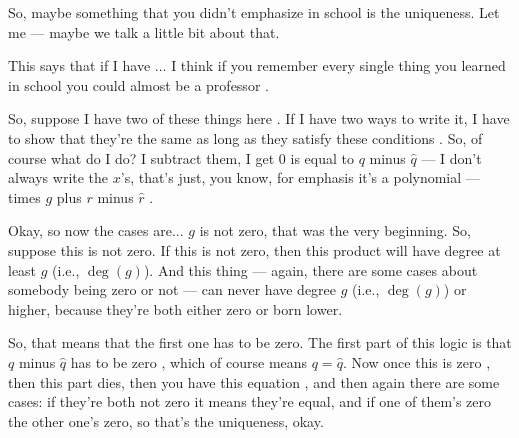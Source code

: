 \begin{content}
\end{content}

\begin{proofWrapper}

\begin{speech}[00:28:56 - 00:30:46]
So, maybe something that you didn't emphasize in school is the uniqueness. Let me --- maybe we talk a little bit about that.

This says that if I have ... I think if you remember every single thing you learned in school you could almost be a professor .

So, suppose I have two of these things here . If I have two ways to write it, I have to show that they're the same as long as they satisfy these conditions . So, of course what do I do? I subtract them, I get $0$ is equal to $q$ minus $\hat{q}$ --- I don't always write the $x$'s, that's just, you know, for emphasis it's a polynomial --- times $g$ plus $r$ minus $\hat{r}$ .

Okay, so now the cases are... $g$ is not zero, that was the very beginning. So, suppose this  is not zero. If this is not zero, then this product  will have degree at least $g$ (i.e., $\deg(g)$). And this thing  --- again, there are some cases about somebody being zero or not --- can never have degree $g$ (i.e., $\deg(g)$) or higher, because they're both either zero or born lower.

So, that means that the first one has to be zero. The first part of this logic is that $q$ minus $\hat{q}$ has to be zero , which of course means $q = \hat{q}$. Now once this is zero , then this part dies, then you have this equation , and then again there are some cases: if they're both not zero it means they're equal, and if one of them's zero the other one's zero, so that's the uniqueness, okay.
\end{speech}


\end{proofWrapper}
